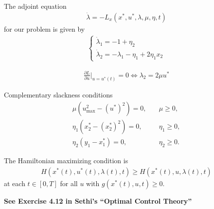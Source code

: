 \documentclass[a4paper]{article}
\theoremstyle{definition}
\theoremstyle{plain}
\begin{document}
The adjoint equation
\begin{align*}
  \dot{\lambda} = - L_{x}(x^{*}, u^{*},  \lambda, \mu, \eta, t)
\end{align*}
for our problem is given by
\begin{align*}
  \begin{cases}
  \dot{\lambda}_{1} = - 1 + \eta_{2} \\
  \dot{\lambda}_{2} = - \lambda_{1} - \eta_{1} + 2\eta_{1}x_{2}
  \end{cases}
\end{align*}

\begin{align*}
  \frac{\partial L}{\partial u}|_{u=u^{*}(t)} = 0 \iff  \lambda_{2} = 2 \mu u^{*}
\end{align*}

Complementary slackness conditions
\begin{align*}
  \mu (u_{\max}^{2} - {(u^{*})}^{2}) = 0 ,& \quad \mu \geq 0 , \\
 \eta_{1} (x_{2}^{*} - (x_{2}^{*})^{2}) = 0 ,& \quad \eta_{1} \geq 0 , \\
 \eta_{2} (y_{1} - x_{1}^{*}) = 0 ,& \quad \eta_{2} \geq 0 .
\end{align*}

The Hamiltonian maximizing condition is
\begin{align*}
  H(x^{*}(t), u^{*}(t), \lambda(t), t) \geq H(x^{*}(t), u, \lambda(t), t)
\end{align*}
at each $t \in [0, T]$ for all $u$ with $g(x^{*}(t), u, t) \geq 0$.


\textbf{See Exercise 4.12 in Sethi's ``Optimal Control Theory''}


\newpage


\end{document}
